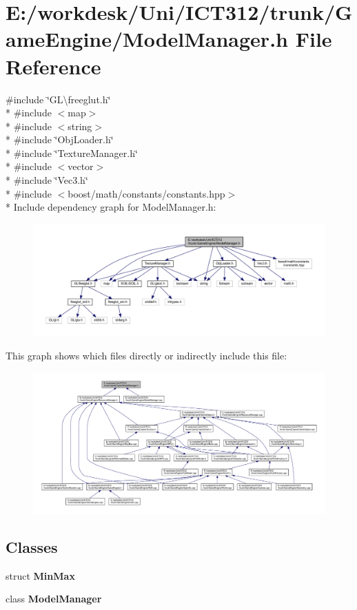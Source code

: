 \section{E\+:/workdesk/\+Uni/\+I\+C\+T312/trunk/\+Game\+Engine/\+Model\+Manager.h File Reference}
\label{_model_manager_8h}
{\ttfamily \#include \char`\"{}G\+L\textbackslash{}freeglut.\+h\char`\"{}}\\*
{\ttfamily \#include $<$map$>$}\\*
{\ttfamily \#include $<$string$>$}\\*
{\ttfamily \#include \char`\"{}Obj\+Loader.\+h\char`\"{}}\\*
{\ttfamily \#include \char`\"{}Texture\+Manager.\+h\char`\"{}}\\*
{\ttfamily \#include $<$vector$>$}\\*
{\ttfamily \#include \char`\"{}Vec3.\+h\char`\"{}}\\*
{\ttfamily \#include $<$boost/math/constants/constants.\+hpp$>$}\\*
Include dependency graph for Model\+Manager.\+h\+:\nopagebreak
\begin{figure}[H]
\begin{center}
\leavevmode
\includegraphics[width=350pt]{d7/d24/_model_manager_8h__incl}
\end{center}
\end{figure}
This graph shows which files directly or indirectly include this file\+:
\nopagebreak
\begin{figure}[H]
\begin{center}
\leavevmode
\includegraphics[width=350pt]{d8/d52/_model_manager_8h__dep__incl}
\end{center}
\end{figure}
\subsection*{Classes}
\begin{DoxyCompactItemize}
\item 
struct {\bf Min\+Max}
\item 
class {\bf Model\+Manager}
\end{DoxyCompactItemize}
